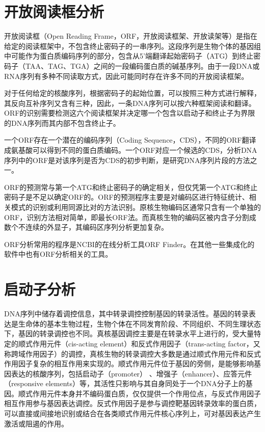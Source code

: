 \section{开放阅读框分析}
开放阅读框（Open Reading Frame，ORF，开放阅读框架、开放读架等）是指在给定的阅读框架中，不包含终止密码子的一串序列。这段序列是生物个体的基因组中可能作为蛋白质编码序列的部分，包含从5'端翻译起始密码子（ATG）到终止密码子（TAA、TAG、TGA）之间的一段编码蛋白质的碱基序列。由于一段DNA或RNA序列有多种不同读取方式，因此可能同时存在许多不同的开放阅读框架。

对于任何给定的核酸序列，根据密码子的起始位置，可以按照三种方式进行解释，其反向互补序列又含有三种，因此，一条DNA序列可以按六种框架阅读和翻译。ORF的识别需要检测这六个阅读框架并决定哪一个包含以启动子和终止子为界限的DNA序列而其内部不包含终止子。

一个ORF存在一个潜在的编码序列（Coding Sequence，CDS），不同的ORF翻译成氨基酸可以得到不同的蛋白质编码。一个ORF对应一个候选的CDS，分析DNA序列中的ORF是对该序列是否为CDS的初步判断，是研究DNA序列片段的方法之一。

ORF的预测常与第一个ATG和终止密码子的确定相关，但仅凭第一个ATG和终止密码子是不足以确定ORF的。ORF的预测程序主要是对编码区进行特征统计、相关模式的识别或利用同源比对的方法识别。原核生物编码区通常只含有一个单独的ORF，识别方法相对简单，即最长ORF法。而真核生物的编码区被内含子分割成数个不连续的外显子，其编码区序列分析更加复杂。

ORF分析常用的程序是NCBI的在线分析工具ORF Finder。在其他一些集成化的软件中也有ORF分析相关的工具。

\section{启动子分析}
DNA序列中储存着调控信息，其中转录调控控制基因的转录活性。基因的转录表达是生命体的基本生物过程，生物个体在不同发育阶段、不同组织、不同生理状态下，基因的转录调控也不同。真核基因调控主要是在转录水平上进行的，受大量特定的顺式作用元件（cis-acting element）和反式作用因子（trans-acting factor，又称跨域作用因子）的调控，真核生物的转录调控大多数是通过顺式作用元件和反式作用因子复杂的相互作用来实现的。顺式作用元件位于基因的旁侧，是能够影响基因表达的核酸序列，包括启动子（promoter） 、增强子（enhancer）、应答元件（responsive elements）等，其活性只影响与其自身同处于一个DNA分子上的基因。顺式作用元件本身并不编码蛋白质，仅仅提供一个作用位点，与反式作用因子相互作用参与基因表达调控。反式作用因子是参与调控靶基因转录效率的蛋白质，可以直接或间接地识别或结合在各类顺式作用元件核心序列上，可对基因表达产生激活或阻遏的作用。

